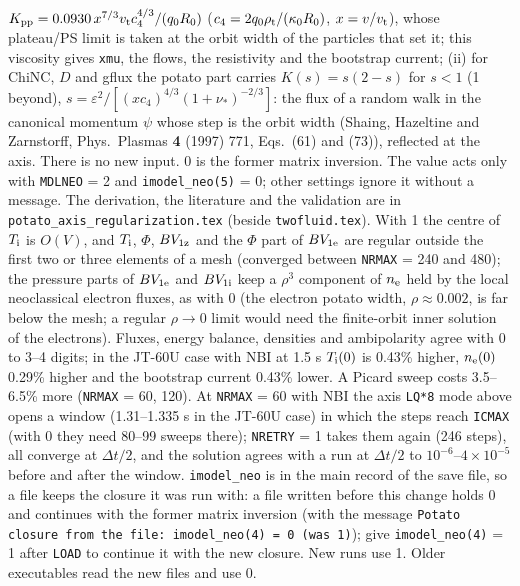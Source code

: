 \documentclass[11pt]{article}
\def\r#1{{\rm#1}}
\begin{document}
\begin{itemize}
  $K_\r{pp} = 0.0930\,x^{7/3}v_\r{t}c_4^{4/3}/(q_0R_0)$ ($c_4 = 2q_0\rho_\r{t}/(\kappa_0R_0)$, $x = v/v_\r{t}$), whose
  plateau/PS limit is taken at the orbit width of the particles that set it; this viscosity gives \texttt{xmu}, the
  flows, the resistivity and the bootstrap current; (ii) for ChiNC, $D$ and gflux the potato part carries
  $K(s) = s(2-s)$ for $s<1$ (1 beyond), $s = \varepsilon^2/[(xc_4)^{4/3}(1+\nu_*)^{-2/3}]$: the flux of a random walk in
  the canonical momentum $\psi$ whose step is the orbit width (Shaing, Hazeltine and Zarnstorff, Phys.\ Plasmas
  \textbf{4} (1997) 771, Eqs.~(61) and (73)), reflected at the axis.  There is no new input.  0 is the former matrix
  inversion.  The value acts only with \texttt{MDLNEO} = 2 and \texttt{imodel\_neo(5)} = 0; other settings ignore it
  without a message.  The derivation, the literature and the validation are in \texttt{potato\_axis\_regularization.tex}
  (beside \texttt{twofluid.tex}).  With 1 the centre of $T_\r{i}$ is $O(V)$, and $T_\r{i}$, $\Phi$, $BV_{1\r{z}}$
  and the $\Phi$ part of $BV_{1\r{e}}$ are regular outside the first two or three elements of a mesh (converged
  between \texttt{NRMAX} = 240 and 480); the pressure parts of $BV_{1\r{e}}$ and $BV_{1\r{i}}$ keep a $\rho^3$
  component of $n_\r{e}$ held by the local neoclassical electron fluxes, as with 0 (the electron potato width,
  $\rho\approx0.002$, is far below the mesh; a regular $\rho\to0$ limit would need the finite-orbit inner solution of
  the electrons).  Fluxes, energy balance, densities and ambipolarity agree with 0 to 3--4 digits; in the JT-60U case
  with NBI at 1.5 s $T_\r{i}(0)$ is 0.43\% higher, $n_\r{e}(0)$ 0.29\% higher and the bootstrap current 0.43\% lower.
  A Picard sweep costs 3.5--6.5\% more (\texttt{NRMAX} = 60, 120).  At \texttt{NRMAX} = 60 with NBI the axis
  \texttt{LQ*8} mode above opens a window (1.31--1.335 s in the JT-60U case) in which the steps reach \texttt{ICMAX}
  (with 0 they need 80--99 sweeps there); \texttt{NRETRY} = 1 takes them again (246 steps), all converge at $\Delta t/2$,
  and the solution agrees with a run at $\Delta t/2$ to $10^{-6}$--$4\times10^{-5}$ before and after the window.
  \texttt{imodel\_neo} is in the main record of the save file, so a file keeps the closure it was run with: a file
  written before this change holds 0 and continues with the former matrix inversion (with the message
  \texttt{Potato closure from the file: imodel\_neo(4) = 0 (was 1)}); give \texttt{imodel\_neo(4)} = 1 after
  \texttt{LOAD} to continue it with the new closure.  New runs use 1.  Older executables read the new files and use 0.

\end{itemize}
\end{document}
